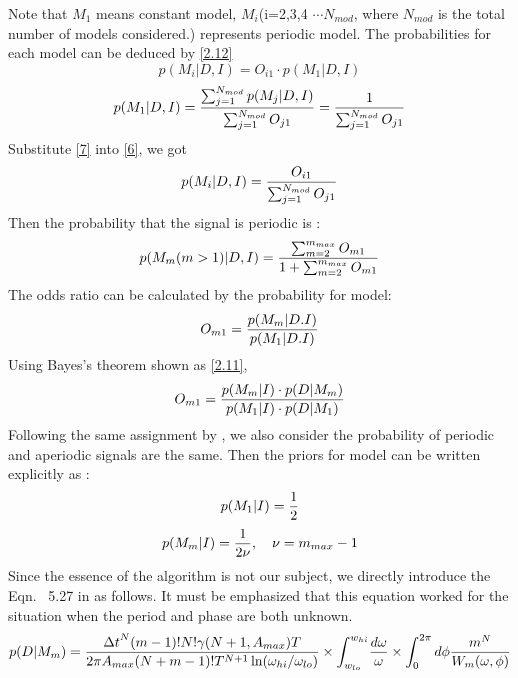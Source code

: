 \documentclass[fleqn,usenatbib]{mnras}
\begin{document}
Note that $M_1$ means constant model, $M_i$(i=2,3,4 $\cdots N_{mod}$, where $N_{mod}$ is the total number of models considered.) represents periodic model. The probabilities for each model can be deduced by \ref{2.12}
\begin{equation}\label{6}
p(M_i|D,I)=O_{i1}\cdot p(M_1|D,I)
\end{equation}
\begin{equation}\label{7}
p(M_1|D,I)={{\sum_{j=1}^{N_{mod}} p(M_j|D,I)}\over {\sum_{j=1}^{N_{mod}} O_{j1}}}
={1\over {\sum_{j=1}^{N_{mod}} O_{j1}}}	
\end{equation}
Substitute \ref{7} into \ref{6}, we got
\begin{equation}\label{2.13}
p(M_i|D,I)={O_{i1}\over {\sum_{j=1}^{N_{mod}} O_{j1}}}
\end{equation}
Then the probability that the signal is periodic is :
\begin{equation}\label{5.2}
p(M_m(m>1)|D,I)={{\sum_{m=2}^{m_{max}} O_{m1}}\over {1+\sum_{m=2}^{m_{max}} O_{m1}}}
\end{equation}
The odds ratio can be calculated by the probability for model:
\begin{equation}
O_{m1}={{p(M_m|D.I)}\over {p(M_1|D.I)}}
\end{equation}
Using Bayes's theorem shown as \ref{2.11},
\begin{equation}\label{11}
O_{m1}={{p(M_m|I)\cdot p(D|M_m)}\over {p(M_1|I)\cdot p(D|M_1)}}
\end{equation}
Following the same assignment by \citep{1992ApJ...398..146G}, we also consider the probability of periodic and aperiodic signals are the same. Then the priors for model can be written explicitly as :
\begin{equation}\label{12}
p(M_1|I)={1\over 2}	
\end{equation}
\begin{equation}\label{13}
p(M_m|I)={1\over {2\nu}}	, \quad \nu =m_{max}-1
\end{equation}
Since the essence of the algorithm is not our subject, we directly introduce the Eqn.~ 5.27 in \citep{1992ApJ...398..146G} as follows. It must be emphasized that this equation worked for the situation when the period and phase are both unknown. 
\begin{equation}\label{5.27}
p(D|M_m)={{{\Delta t}^N (m-1)! N! \gamma(N+1,A_{max})T}\over{2\pi A_{max} (N+m-1)!T^{N+1} \ln(\omega_{hi}/\omega_{lo})}}\times {\int_{w_{lo}}^{w_{hi}}}{{d\omega}\over{\omega}}\times {\int_0^{2\pi}d\phi{m^N\over W_m(\omega,\phi)}}	
\end{equation}
\end{document}
